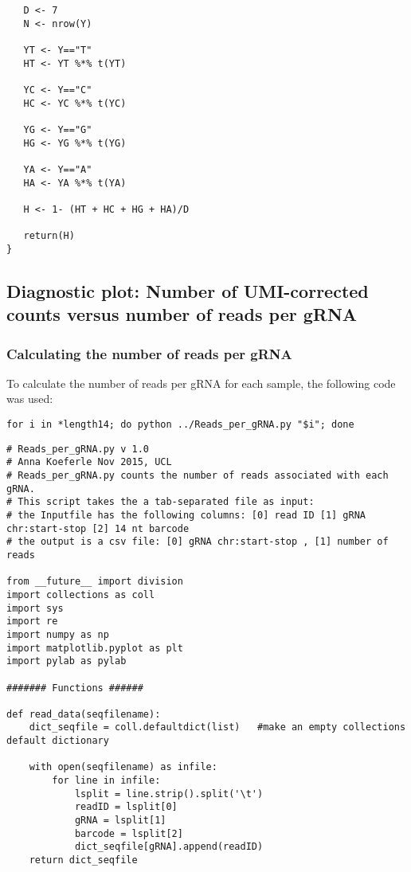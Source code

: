 \begin{footnotesize}
\begin{lstlisting}
   D <- 7
   N <- nrow(Y)
   
   YT <- Y=="T"
   HT <- YT %*% t(YT)
   
   YC <- Y=="C"
   HC <- YC %*% t(YC)
   
   YG <- Y=="G"
   HG <- YG %*% t(YG)
   
   YA <- Y=="A"
   HA <- YA %*% t(YA)
   
   H <- 1- (HT + HC + HG + HA)/D
   
   return(H)   
}

\end{lstlisting}


\subsection{Diagnostic plot: Number of UMI-corrected counts versus number of reads per gRNA}
\label{subsec:Diagnostic_plot Counts vs reads}

\subsubsection{Calculating the number of reads per gRNA}

To calculate the number of reads per gRNA for each sample, the following code was used:

\begin{lstlisting}
for i in *length14; do python ../Reads_per_gRNA.py "$i"; done
\end{lstlisting}



\begin{lstlisting}
# Reads_per_gRNA.py v 1.0
# Anna Koeferle Nov 2015, UCL
# Reads_per_gRNA.py counts the number of reads associated with each gRNA.
# This script takes the a tab-separated file as input:
# the Inputfile has the following columns: [0] read ID [1] gRNA chr:start-stop [2] 14 nt barcode
# the output is a csv file: [0] gRNA chr:start-stop , [1] number of reads

from __future__ import division
import collections as coll
import sys
import re
import numpy as np
import matplotlib.pyplot as plt
import pylab as pylab

####### Functions ######

def read_data(seqfilename):
    dict_seqfile = coll.defaultdict(list)   #make an empty collections default dictionary

    with open(seqfilename) as infile:
        for line in infile:
            lsplit = line.strip().split('\t')
            readID = lsplit[0]
            gRNA = lsplit[1]
            barcode = lsplit[2]
            dict_seqfile[gRNA].append(readID)
    return dict_seqfile



\end{lstlisting}
\end{footnotesize}
